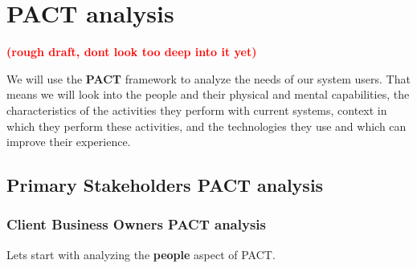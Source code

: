 \documentclass[]{VUMIFTemplateClass}
\begin{document}








\section{PACT analysis}

\begin{center}
    \textcolor{red}{\textbf{(rough draft, dont look too deep into it yet)}}
\end{center}


We will use the \textbf{PACT} framework to analyze the needs of our system
users. That means we will look into the people and their physical and mental
capabilities, the characteristics of the activities they perform with current
systems, context in which they perform these activities, and the technologies
they use and which can improve their experience.


\subsection{Primary Stakeholders PACT analysis}

\subsubsection{Client Business Owners PACT analysis}

Lets start with analyzing the \textbf{people} aspect of PACT. 
\end{document}
